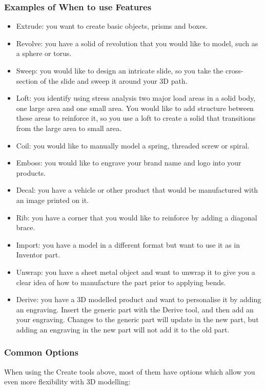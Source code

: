 \subsubsection{Examples of When to use Features}
\begin{itemize}
    \item Extrude: you want to create basic objects, prisms and boxes.
    \item Revolve: you have a solid of revolution that you would like to model, such as a sphere or torus.
    \item Sweep: you would like to design an intricate slide, so you take the cross-section of the slide and sweep it around your 3D path.
    \item Loft: you identify using stress analysis two major load areas in a solid body, one large area and one small area. You would like to add structure between these areas to reinforce it, so you use a loft to create a solid that transitions from the large area to small area.
    \item Coil: you would like to manually model a spring, threaded screw or spiral.
    \item Emboss: you would like to engrave your brand name and logo into your products.
    \item Decal: you have a vehicle or other product that would be manufactured with an image printed on it.
    \item Rib: you have a corner that you would like to reinforce by adding a diagonal brace.
    \item Import: you have a model in a different format but want to use it as in Inventor part.
    \item Unwrap: you have a sheet metal object and want to unwrap it to give you a clear idea of how to manufacture the part prior to applying bends.
    \item Derive: you have a 3D modelled product and want to personalise it by adding an engraving. Insert the generic part with the Derive tool, and then add an your engraving. Changes to the generic part will update in the new part, but adding an engraving in the new part will not add it to the old part.
\end{itemize}

\subsubsection{Common Options}
When using the Create tools above, most of them have options which allow you even more flexibility with 3D modelling:

